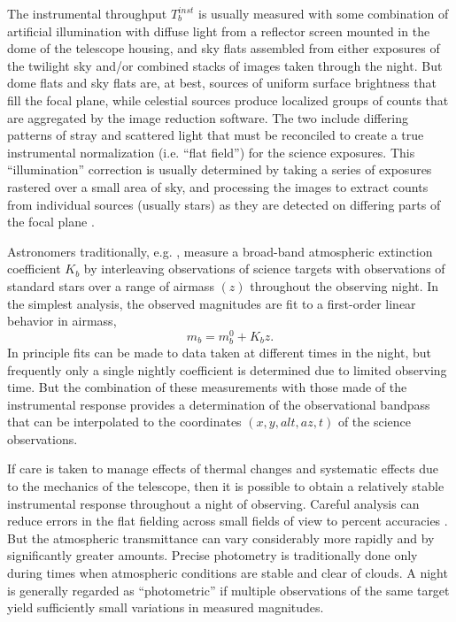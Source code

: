 \documentclass[manuscript]{aastex}
\begin{document}
The instrumental throughput $T_b^{inst}$ is usually measured with some combination of artificial illumination
with diffuse light from a reflector screen mounted in the dome of the telescope housing,
and sky flats assembled from either exposures of the twilight sky and/or combined stacks of images taken through the night.
But dome flats and sky flats are, at best, sources of uniform surface brightness that fill the focal plane,
while celestial sources produce localized groups of counts that are aggregated by the image reduction software.
The two include differing patterns of stray and scattered light that must be reconciled to create a true instrumental normalization
(i.e. ``flat field'') for the science exposures.  
This ``illumination'' correction is usually determined by taking a series of exposures rastered over a small area of sky,
and processing the images to extract counts from individual sources (usually stars) as they are detected on differing parts of the focal plane
\cite{manfroid96} \cite{marshall05} \cite{regnault09}.

Astronomers traditionally, e.g. \cite{sterken06}, measure a broad-band atmospheric extinction
coefficient $K_b$ by interleaving observations of science targets
with observations of standard stars over a range of airmass $(z)$ throughout the observing night. 
In the simplest analysis, the observed magnitudes are fit to a first-order linear behavior in airmass,
\begin{equation}
\label{eqn:kcoef}
    m_b = m_b^0 + K_b z.
\end{equation}
In principle fits can be made to data taken at different times in the night,
but frequently only a single nightly coefficient is determined due to limited observing time.
But the combination of these measurements with those made of the instrumental response provides a determination of the observational bandpass that can be
interpolated to the coordinates $(x,y,alt,az,t)$ of the science observations.

If care is taken to manage effects of thermal changes and systematic effects due to the mechanics of the telescope,
then it is possible to obtain a relatively stable instrumental response throughout a night of observing.
Careful analysis can reduce errors in the flat fielding across small fields of view to percent accuracies \cite{landolt92} \cite{stetson05}.
But the atmospheric transmittance can vary considerably more rapidly and by significantly greater amounts. 
Precise photometry is traditionally done only during times when atmospheric conditions are stable and clear of clouds.
A night is generally regarded as ``photometric'' if multiple observations of the same target yield sufficiently 
small variations in measured magnitudes. 
\end{document}
